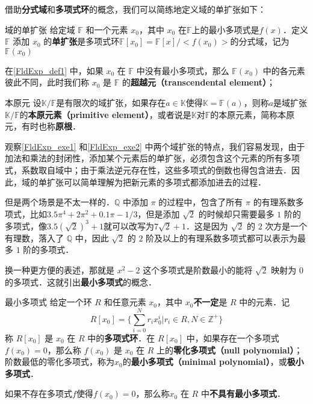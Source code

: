 借助\textbf{分式域}和\textbf{多项式环}的概念，我们可以简练地定义域的单扩张如下：


\begin{definition}{域的单扩张}\label{FldExp_def1}
给定域 $\mathbb{F}$ 和一个元素 $x_0$，其中 $x_0$ 在$\mathbb{F}$上的最小多项式是$f(x)$．定义 $\mathbb{F}$ 添加 $x_0$ 的\textbf{单扩张}是多项式环$\mathbb{F}[x_0]=\mathbb{F}[x]/<f(x_0)>$的分式域，记为$\mathbb{F}(x_0)$
\end{definition}

在\autoref{FldExp_def1} 中，如果 $x_0$ 在 $\mathbb{F}$ 中没有最小多项式，那么 $\mathbb{F}(x_0)$ 中的各元素彼此不同，此时我们称 $x_0$ 是 $\mathbb{F}$ 的\textbf{超越元（transcendental element）}；

\begin{definition}{本原元}\label{FldExp_def7}
设$\mathbb{K}/\mathbb{F}$是有限次的域扩张，如果存在$a\in\mathbb{K}$使得$\mathbb{K}=\mathbb{F}(a)$，则称$a$是域扩张$\mathbb{K}/\mathbb{F}$的\textbf{本原元素（primitive element）}，或者说是$\mathbb{K}$对$\mathbb{F}$的本原元素，简称本原元，有时也称\textbf{原根}．
\end{definition}

观察\autoref{FldExp_exe1} 和\autoref{FldExp_exe2} 中两个域扩张的特点，我们容易发现，由于加法和乘法的封闭性，添加某个元素后的单扩张，必须包含这个元素的所有多项式，系数取自域中；由于乘法逆元存在性，这些多项式的倒数也得包含进去．因此，域的单扩张可以简单理解为把新元素的多项式都添加进去的过程．

但是两个场景是不太一样的．$\mathbb{Q}$ 中添加 $\pi$ 的过程中，包含了所有 $\pi$ 的有理系数多项式，比如$3.5\pi^4+2\pi^2+0.1\pi-1/3$，但是添加 $\sqrt{2}$ 的时候却只需要最多 $1$ 阶的多项式，像$3.5(\sqrt{2})^3+1$就可以改写为$7\sqrt{2}+1$．这是因为 $\sqrt{2}$ 的 $2$ 次方是一个有理数，落入了 $\mathbb{Q}$ 中，因此 $\sqrt{2}$ 的 $2$ 阶及以上的有理系数多项式都可以表示为最多 $1$ 阶的多项式．

换一种更方便的表述，那就是 $x^2-2$ 这个多项式是阶数最小的能将 $\sqrt{2}$ 映射为 $0$ 的多项式．这就引出\textbf{最小多项式}的概念．

\begin{definition}{最小多项式}
给定一个环 $R$ 和任意元素 $x_0$，其中 $x_0$\textbf{不一定}是 $R$ 中的元素．记
$$R[x_0]=\{\sum_{i=0}^N r_ix_0^i|r_i\in R, N\in\mathbb{Z}^+\}$$称 $R[x_0]$ 是 $x_0$ 在 $R$ 中的\textbf{多项式环}．在 $R[x_0]$ 中，如果存在一个多项式 $f(x_0)=0$，那么称 $f(x_0)$ 是 $x_0$ 在 $R$ 上的\textbf{零化多项式（null polynomial）}；阶数最低的零化多项式，称为$x_0$的\textbf{最小多项式（minimal polynomial）}，或\textbf{极小多项式}．

如果不存在多项式$f$使得$f(x_0)=0$，那么称$x_0$ 在 $R$ 中\textbf{不具有最小多项式}．
\end{definition}


